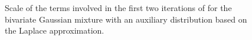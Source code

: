 \documentclass[11pt,a4paper]{report}
\begin{document}
\begin{figure}[t]
\centering
{}
\caption{Scale of the terms involved in the first two iterations of  for the bivariate Gaussian mixture with an auxiliary distribution based on the Laplace approximation.
\label{fig:gmm:laplace-terms}}
\end{figure}
\end{document}
